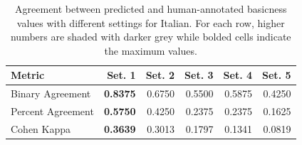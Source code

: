 \documentclass[preprint,12pt,authoryear]{elsarticle}
\begin{document}
\begin{table}[ht]
\centering
\caption{Agreement between predicted and human-annotated basicness values with different settings for Italian. For each row, higher numbers are shaded with darker grey while bolded cells indicate the maximum values.}
\label{tab:agreement_scores_comparison_it}
\begin{tabular}{@{}l r r r r r@{}}
\toprule
\textbf{Metric} & \textbf{Set. 1} & \textbf{Set. 2} & \textbf{Set. 3} & \textbf{Set. 4} & \textbf{Set. 5} \\ 
\midrule
Binary Agreement     & \cellcolor{gray!85} \textbf{0.8375} & \cellcolor{gray!58} 0.6750 & \cellcolor{gray!45} 0.5500 & \cellcolor{gray!50} 0.5875 & \cellcolor{gray!36} 0.4250 \\
Percent Agreement    & \cellcolor{gray!65} \textbf{0.5750} & \cellcolor{gray!36} 0.4250 & \cellcolor{gray!25} 0.2375 & \cellcolor{gray!25} 0.2375 & \cellcolor{gray!18} 0.1625 \\
Cohen Kappa          & \cellcolor{gray!41} \textbf{0.3639} & \cellcolor{gray!34} 0.3013 & \cellcolor{gray!22} 0.1797 & \cellcolor{gray!17} 0.1341 & \cellcolor{gray!10} 0.0819 \\
\bottomrule
\end{tabular}
\smallskip
\end{table}
\end{document}
